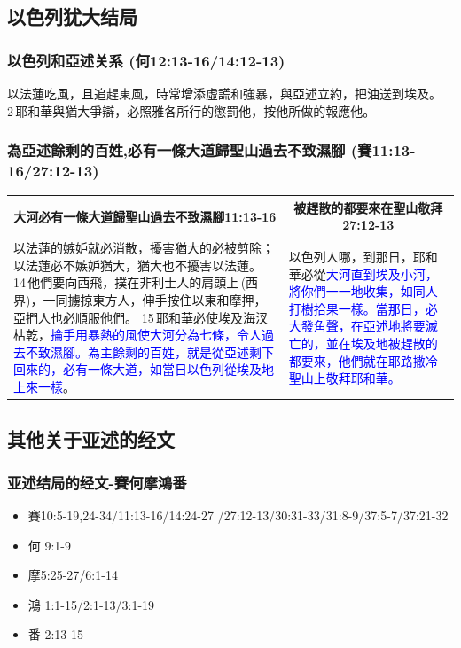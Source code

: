 \subsection{以色列犹大结局}
\subsubsection{以色列和亞述关系  (何12:13-16/14:12-13)}
以法蓮吃風，且追趕東風，時常增添虛謊和強暴，與亞述立約，把油送到埃及。 2 耶和華與猶大爭辯，必照雅各所行的懲罰他，按他所做的報應他。


\subsubsection{為亞述餘剩的百姓,必有一條大道歸聖山過去不致濕腳  (賽11:13-16/27:12-13)}
\begin{table}[H]
\centering
\begin{tabular}{p{10.5cm}|p{6.0cm}}\hline\hline
\multicolumn{1}{c|}{大河必有一條大道歸聖山過去不致濕腳11:13-16}&\multicolumn{1}{c}{被趕散的都要來在聖山敬拜27:12-13}\\\hline
以法蓮的嫉妒就必消散，擾害猶大的必被剪除；以法蓮必不嫉妒猶大，猶大也不擾害以法蓮。 14 他們要向西飛，撲在非利士人的肩頭上 (西界)，一同擄掠東方人，伸手按住以東和摩押，亞捫人也必順服他們。 15 耶和華必使埃及海汊枯乾，\textcolor{blue}{掄手用暴熱的風使大河分為七條，令人過去不致濕腳。為主餘剩的百姓，就是從亞述剩下回來的，必有一條大道，如當日以色列從埃及地上來一樣}。
&以色列人哪，到那日，耶和華必從\textcolor{blue}{大河直到埃及小河，將你們一一地收集，如同人打樹拾果一樣。當那日，必大發角聲，在亞述地將要滅亡的，並在埃及地被趕散的都要來，他們就在耶路撒冷聖山上敬拜耶和華。}\\\hline
\end{tabular}
\end{table}

\subsection{其他关于亚述的经文}
\subsubsection{亚述结局的经文-賽何摩鴻番}
\begin{itemize}
\item 賽10:5-19,24-34/11:13-16/14:24-27 /27:12-13/30:31-33/31:8-9/37:5-7/37:21-32
\item 何 9:1-9
\item 摩5:25-27/6:1-14
\item 鴻 1:1-15/2:1-13/3:1-19
\item 番 2:13-15
\end{itemize}

